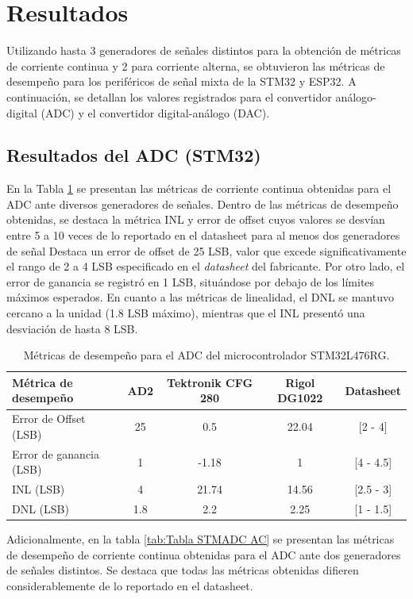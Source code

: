 \documentclass{article}
\begin{document}
\section{Resultados}
Utilizando hasta 3 generadores de señales distintos para la obtención de métricas de corriente continua y 2 para corriente alterna, se obtuvieron las métricas de desempeño para los periféricos de señal mixta de la STM32 y ESP32. A continuación, se detallan los valores registrados para el convertidor análogo-digital (ADC) y el convertidor digital-análogo (DAC).
\subsection{Resultados del ADC (STM32)}
En la Tabla \ref{tab:Tabla STMADC DC} se presentan las métricas de corriente continua obtenidas para el ADC ante diversos generadores de señales. Dentro de las métricas de desempeño obtenidas, se destaca la métrica INL  y error de offset cuyos valores se desvían entre 5 a 10 veces de lo reportado en el datasheet para al menos dos generadores de señal
Destaca un error de offset de 25 LSB, valor que excede significativamente el rango de 2 a 4 LSB especificado en el \textit{datasheet} del fabricante. Por otro lado, el error de ganancia se registró en 1 LSB, situándose por debajo de los límites máximos esperados. En cuanto a las métricas de linealidad, el DNL se mantuvo cercano a la unidad (1.8 LSB máximo), mientras que el INL presentó una desviación de hasta 8 LSB.
\begin{table}[h]
    \centering
    \begin{tabular}{|l|c|c|c|c|}
        \hline
        \textbf{Métrica de desempeño} & \textbf{AD2} & \textbf{Tektronik CFG 280} &\textbf{Rigol DG1022} & \textbf{Datasheet} \\ \hline
        Error de Offset (LSB)  & 25         & 0.5   & 22.04 &[2 - 4]   \\ \hline
        Error de ganancia (LSB) & 1         & -1.18 & 1     &[4 - 4.5] \\ \hline
        INL (LSB)               & 4         & 21.74 & 14.56 &[2.5 - 3] \\ \hline
        DNL (LSB)               & 1.8       & 2.2   & 2.25  &[1 - 1.5] \\ \hline
    \end{tabular}
    \caption{Métricas de desempeño para el ADC del microcontrolador STM32L476RG.}
    \label{tab:Tabla STMADC DC}
\end{table}
Adicionalmente, en la tabla \ref{tab:Tabla STMADC AC} se presentan las métricas de desempeño de corriente continua obtenidas para el ADC ante dos generadores de señales distintos. Se destaca que todas las métricas obtenidas difieren considerablemente de lo reportado en el datasheet.
\end{document}
